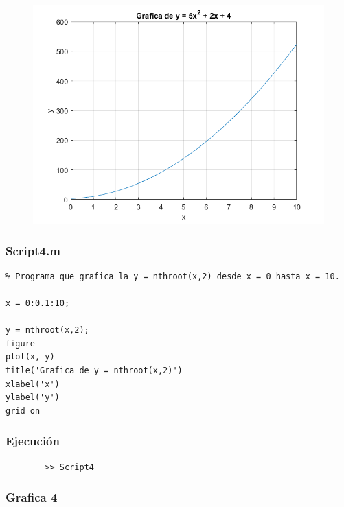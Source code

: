 \documentclass{article}
\begin{document}
	\begin{figure}[h]
		\centering
		\includegraphics[width=\textwidth]{grafica3.png}
	\end{figure}
	
	\newpage
	
	\subsubsection{Script4.m}
	
	\begin{lstlisting}
% Programa que grafica la y = nthroot(x,2) desde x = 0 hasta x = 10.

x = 0:0.1:10;

y = nthroot(x,2);
figure
plot(x, y)
title('Grafica de y = nthroot(x,2)')
xlabel('x')
ylabel('y')
grid on
	\end{lstlisting}
	
	\subsubsection{Ejecución}
	
	\begin{lstlisting}
		>> Script4
	\end{lstlisting}
	
	\subsubsection{Grafica 4}
	
\end{document}

